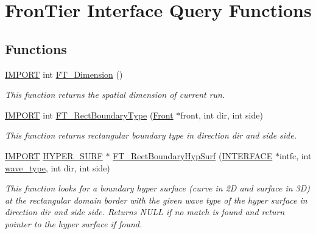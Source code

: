 \hypertarget{group___q_u_e_r_y}{}\section{Fron\+Tier Interface Query Functions}
\label{group___q_u_e_r_y}
\subsection*{Functions}
\begin{DoxyCompactItemize}
\item 
\hyperlink{cdecs_8h_a773175d74e73776d69c3e538f17de1ee}{I\+M\+P\+O\+RT} int \hyperlink{group___q_u_e_r_y_ga4d9374ec9ecc9610a746e12284b4bd42}{F\+T\+\_\+\+Dimension} ()
\begin{DoxyCompactList}\small\item\em This function returns the spatial dimension of current run. \end{DoxyCompactList}\item 
\hyperlink{cdecs_8h_a773175d74e73776d69c3e538f17de1ee}{I\+M\+P\+O\+RT} int \hyperlink{group___q_u_e_r_y_ga1d60b2b7c1875fd799717fdee8ab42ee}{F\+T\+\_\+\+Rect\+Boundary\+Type} (\hyperlink{fdecs_8h_ac32202b798f848095c489cfd04c4ca5f}{Front} $\ast$front, int dir, int side)
\begin{DoxyCompactList}\small\item\em This function returns rectangular boundary type in direction dir and side side. \end{DoxyCompactList}\item 
\hyperlink{cdecs_8h_a773175d74e73776d69c3e538f17de1ee}{I\+M\+P\+O\+RT} \hyperlink{int_8h_acef50fa4757ce0d3f75c97fab5a175bc}{H\+Y\+P\+E\+R\+\_\+\+S\+U\+RF} $\ast$ \hyperlink{group___q_u_e_r_y_ga448da7f0f1046c2719bde3e7bbd8789a}{F\+T\+\_\+\+Rect\+Boundary\+Hyp\+Surf} (\hyperlink{int_8h_a58cf562d0d320a608294b7310ea167dc}{I\+N\+T\+E\+R\+F\+A\+CE} $\ast$intfc, int \hyperlink{fuserint_8h_aff856283a1093533d99780203d6d3e65}{wave\+\_\+type}, int dir, int side)
\begin{DoxyCompactList}\small\item\em This function looks for a boundary hyper surface (curve in 2D and surface in 3D) at the rectangular domain border with the given wave type of the hyper surface in direction dir and side side. Returns N\+U\+LL if no match is found and return pointer to the hyper surface if found. \end{DoxyCompactList}\item 

\end{DoxyCompactItemize}

